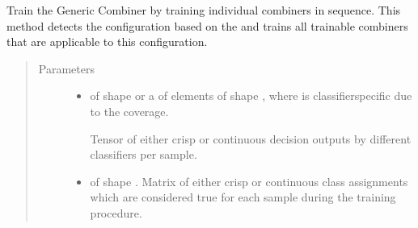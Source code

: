 \documentclass[letterpaper,10pt,english]{sphinxmanual}
\begin{document}
\begin{fulllineitems}
\begin{fulllineitems}
\begin{quote}
\begin{description}
\begin{itemize}
\end{itemize}

\end{description}\end{quote}

\end{fulllineitems}


\begin{fulllineitems}
\label{\detokenize{pusion.auto.generic_combiner:pusion.auto.generic_combiner.GenericCombiner.train_seq}}
\sphinxAtStartPar
Train the Generic Combiner by training individual combiners in sequence.
This method detects the configuration based on the  and trains all trainable combiners
that are applicable to this configuration.
\begin{quote}\begin{description}
\item[{Parameters}] \leavevmode\begin{itemize}
\item {} 
\sphinxAtStartPar
{} \textendash{} 
\sphinxAtStartPar
{} of shape  or a  of
 elements of shape , where  is classifier\sphinxhyphen{}specific
due to the coverage.

\sphinxAtStartPar
Tensor of either crisp or continuous decision outputs by different classifiers per sample.


\item {} 
\sphinxAtStartPar
{} \textendash{}  of shape .
Matrix of either crisp or continuous class assignments which are considered true for each sample during
the training procedure.

\end{itemize}

\end{description}\end{quote}


\end{fulllineitems}
\end{fulllineitems}
\end{document}
